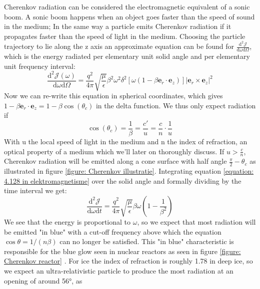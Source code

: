 Cherenkov radiation can be considered the electromagnetic equivalent of a sonic boom. 
A sonic boom happens when an object goes faster than the speed of sound in the
medium; In the same way a particle emits Cherenkov radiation if it propagates faster than 
the speed of light in the medium.  Choosing the particle trajectory to lie along the z
axis an approximate equation can be found\cite{jackson1998classical} for
$\frac{\text{d}^2 \mathscr{J}}{\text{d}\omega \text{d}\Omega}$, which is the energy
radiated per elementary unit solid angle and per elementary unit frequency
interval:
\begin{equation}
	\frac{\text{d}^2 \mathscr{J}(\omega)}{\text{d} \omega \text{d} \Omega} = \frac{q^2}{4\pi}\sqrt{\frac{\mu}{\epsilon}}\beta^2\omega^2\delta^2[\omega(1-\beta \mathbf{e}_r\cdot\mathbf{e}_z)]|\mathbf{e}_r\times\mathbf{e}_z|^2 \label{equation: 4.128 in elektromagnetisme}
\end{equation}
Now we can re-write this equation in spherical coordinates, which gives $1-\beta \mathbf{e}_r\cdot\mathbf{e}_z = 1-\beta\cos(\theta_c)$ in the delta function. We thus only expect radiation if
\begin{equation}
\cos(\theta_c) = \frac{1}{\beta} = \frac{c'}{u} = \frac{c}{n}\cdot\frac{1}{u}
\end{equation}
With u the local speed of light in the medium and n the index of refraction, an optical
property of a medium which we'll later on thoroughly discuss.
If $u>\frac{c}{n}$, Cherenkov radiation will
be emitted along a cone surface with half angle $\frac{\pi}{2}-\theta_c$ as
illustrated in figure \ref{figure: Cherenkov illustratie}. Integrating equation
\ref{equation: 4.128 in elektromagnetisme} over the solid angle and formally
dividing by the time interval we get:
\begin{equation}
	\frac{\text{d}^2\mathscr{J}}{\text{d}\omega \text{d}t} = \frac{q^2}{4\pi}\sqrt{\frac{\mu}{\epsilon}}\beta\omega\left(1-\frac{1}{\beta^2}\right)	
\end{equation}
We see that the energy is proportional to $\omega$, so we expect that most
radiation will be emitted "in blue" with a cut-off frequency above which the
equation $\cos\theta = 1/(n\beta)$ can no longer be satisfied. This "in blue"
characteristic is responsible for the blue glow seen in nuclear reactors as
seen in figure \ref{figure: Cherenkov reactor} .  For ice the index of
refraction is roughly 1.78 in deep ice\cite{Bogorodsky1985}\cite{indexofrefrvalue}, 
so we expect an ultra-relativistic
particle to produce the most radiation at an opening of around 56°, as 
